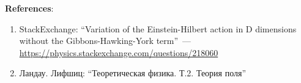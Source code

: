 \documentclass[\docroot/reports/draft/report.tex]{subfiles}
\begin{document}
    \vspace{1cm}

    \textbf{\Large{References}}:
    \begin{enumerate}
        \item \label{bib:se-r-decomposition} StackExchange: \enquote{Variation of the Einstein-Hilbert action in D dimensions without the Gibbons-Hawking-York term}~--- \url{https://physics.stackexchange.com/questions/218060}
        \item \label{bib:landau-t2} Ландау. Лифшиц: \enquote{Теоретическая физика. Т.2. Теория поля}
    \end{enumerate}

\end{document}
